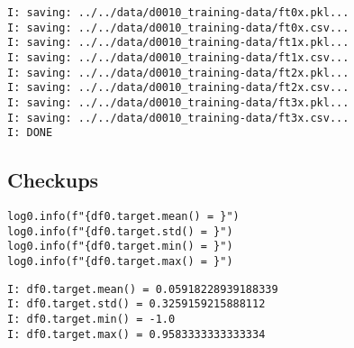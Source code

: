 \documentclass[a4paper,10pt,onecolumn,oneside,openright]{article}
\begin{document}
\begin{verbatim}
I: saving: ../../data/d0010_training-data/ft0x.pkl...
I: saving: ../../data/d0010_training-data/ft0x.csv...
I: saving: ../../data/d0010_training-data/ft1x.pkl...
I: saving: ../../data/d0010_training-data/ft1x.csv...
I: saving: ../../data/d0010_training-data/ft2x.pkl...
I: saving: ../../data/d0010_training-data/ft2x.csv...
I: saving: ../../data/d0010_training-data/ft3x.pkl...
I: saving: ../../data/d0010_training-data/ft3x.csv...
I: DONE
\end{verbatim}

\subsection{Checkups}
\label{sec:orgaf990cd}
\begin{verbatim}
log0.info(f"{df0.target.mean() = }")
log0.info(f"{df0.target.std() = }")
log0.info(f"{df0.target.min() = }")
log0.info(f"{df0.target.max() = }")
\end{verbatim}

\begin{verbatim}
I: df0.target.mean() = 0.05918228939188339
I: df0.target.std() = 0.3259159215888112
I: df0.target.min() = -1.0
I: df0.target.max() = 0.9583333333333334
\end{verbatim}
\end{document}
